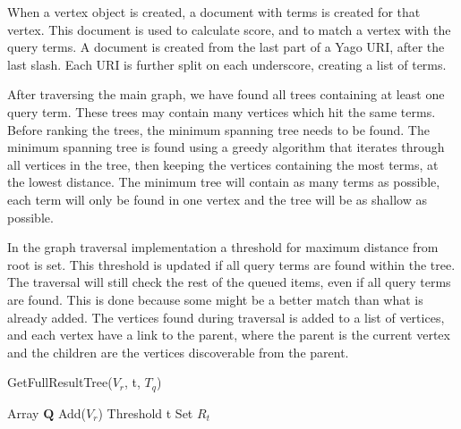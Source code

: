 When a vertex object is created, a document with terms is created for that vertex. This document is used to calculate score, and to match a vertex with the query terms. A document is created from the last part of a Yago URI, after the last slash. Each URI is further split on each underscore, creating a list of terms.

After traversing the main graph, we have found all trees containing at least one query term. These trees may contain many vertices which hit the same terms. Before ranking the trees, the minimum spanning tree needs to be found. The minimum spanning tree is found using a greedy algorithm that iterates through all vertices in the tree, then keeping the vertices containing the most terms, at the lowest distance. The minimum tree will contain as many terms as possible, each term will only be found in one vertex and the tree will be as shallow as possible.

In the graph traversal implementation a threshold for maximum distance from root is set. This threshold is updated if all query terms are found within the tree. The traversal will still check the rest of the queued items, even if all query terms are found. This is done because some might be a better match than what is already added. The vertices found during traversal is added to a list of vertices, and each vertex have a link to the parent, where the parent is the current vertex and the children are the vertices discoverable from the parent.
\begin{algorithm}[H]
    \caption{GetFullResultTree($V_r$, t, $T_q$)}
    \label{fullRT}
    \SetAlgoLined
    Array $\mathbf{Q}$ Add($V_r$)\; Threshold t\; Set $R_t$\;
\end{algorithm}

